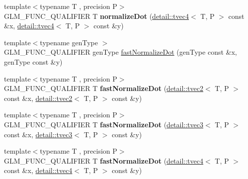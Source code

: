 \begin{DoxyCompactItemize}
\item 
\hypertarget{namespaceglm_a763d17f02acc109bf9818eb8048ce699}{{\footnotesize template$<$typename T , precision P$>$ }\\G\-L\-M\-\_\-\-F\-U\-N\-C\-\_\-\-Q\-U\-A\-L\-I\-F\-I\-E\-R T {\bfseries normalize\-Dot} (\hyperlink{structglm_1_1detail_1_1tvec4}{detail\-::tvec4}$<$ T, P $>$ const \&x, \hyperlink{structglm_1_1detail_1_1tvec4}{detail\-::tvec4}$<$ T, P $>$ const \&y)}\label{namespaceglm_a763d17f02acc109bf9818eb8048ce699}

\item 
{\footnotesize template$<$typename gen\-Type $>$ }\\G\-L\-M\-\_\-\-F\-U\-N\-C\-\_\-\-Q\-U\-A\-L\-I\-F\-I\-E\-R gen\-Type \hyperlink{group__gtx__normalize__dot_gaeb26ec35a51c30dbd0d91f9da45eeafe}{fast\-Normalize\-Dot} (gen\-Type const \&x, gen\-Type const \&y)
\item 
\hypertarget{namespaceglm_ab3e920221404490d3c2bf00ba18ed132}{{\footnotesize template$<$typename T , precision P$>$ }\\G\-L\-M\-\_\-\-F\-U\-N\-C\-\_\-\-Q\-U\-A\-L\-I\-F\-I\-E\-R T {\bfseries fast\-Normalize\-Dot} (\hyperlink{structglm_1_1detail_1_1tvec2}{detail\-::tvec2}$<$ T, P $>$ const \&x, \hyperlink{structglm_1_1detail_1_1tvec2}{detail\-::tvec2}$<$ T, P $>$ const \&y)}\label{namespaceglm_ab3e920221404490d3c2bf00ba18ed132}

\item 
\hypertarget{namespaceglm_a6a98cf963739276c2f766c34bb531bf5}{{\footnotesize template$<$typename T , precision P$>$ }\\G\-L\-M\-\_\-\-F\-U\-N\-C\-\_\-\-Q\-U\-A\-L\-I\-F\-I\-E\-R T {\bfseries fast\-Normalize\-Dot} (\hyperlink{structglm_1_1detail_1_1tvec3}{detail\-::tvec3}$<$ T, P $>$ const \&x, \hyperlink{structglm_1_1detail_1_1tvec3}{detail\-::tvec3}$<$ T, P $>$ const \&y)}\label{namespaceglm_a6a98cf963739276c2f766c34bb531bf5}

\item 
\hypertarget{namespaceglm_a3dec6f079e401edfcf637fa8b89e7c92}{{\footnotesize template$<$typename T , precision P$>$ }\\G\-L\-M\-\_\-\-F\-U\-N\-C\-\_\-\-Q\-U\-A\-L\-I\-F\-I\-E\-R T {\bfseries fast\-Normalize\-Dot} (\hyperlink{structglm_1_1detail_1_1tvec4}{detail\-::tvec4}$<$ T, P $>$ const \&x, \hyperlink{structglm_1_1detail_1_1tvec4}{detail\-::tvec4}$<$ T, P $>$ const \&y)}\label{namespaceglm_a3dec6f079e401edfcf637fa8b89e7c92}


\end{DoxyCompactItemize}

